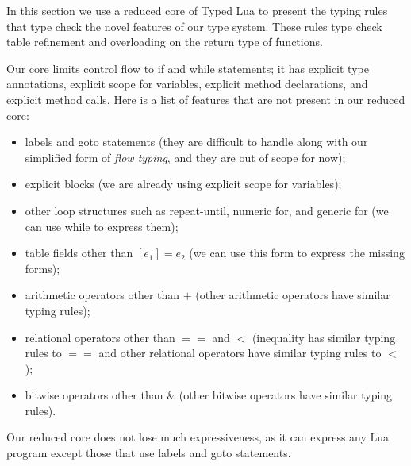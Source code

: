 \documentclass{sigplanconf}
\begin{document}
In this section we use a reduced core of Typed Lua to present
the typing rules that type check the novel features of our type system.
These rules type check table refinement and
overloading on the return type of functions.

Our core limits control flow to if and while statements;
it has explicit type annotations, explicit scope for variables,
explicit method declarations, and explicit method calls.
Here is a list of features that are not present in our reduced core:
\begin{itemize}
\item labels and goto statements (they are difficult to handle along
with our simplified form of \emph{flow typing}, and they are out of
scope for now);
\item explicit blocks (we are already using explicit scope for variables);
\item other loop structures such as repeat-until, numeric for,
and generic for (we can use while to express them);
\item table fields other than $[e_{1}] = e_{2}$
(we can use this form to express the missing forms); 
\item arithmetic operators other than $+$
(other arithmetic operators have similar typing rules);
\item relational operators other than $==$ and $<$
(inequality has similar typing rules to $==$ and
other relational operators have similar typing rules to $<$);
\item bitwise operators other than $\&$
(other bitwise operators have similar typing rules).
\end{itemize}

Our reduced core does not lose much expressiveness, as it can express
any Lua program except those that use labels and goto statements.
\end{document}
